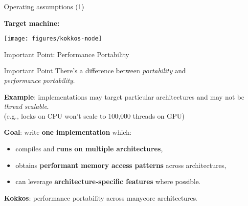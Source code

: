 
\begin{frame}{Operating assumptions (1)}

  \textbf{Target machine:}
  \begin{center}
    \texttt{[image: figures/kokkos-node]}
  \end{center}

\end{frame}


\begin{frame}[fragile]{Important Point: Performance Portability}

  \begin{block}{Important Point}
    There's a difference between \emph{portability} and
    \\ \emph{performance portability}.
  \end{block}

  \textbf{Example}: implementations may target particular architectures and may not be \emph{thread scalable}. \\
    \hspace{20pt} (e.g., locks on CPU won't scale to 100,000 threads on GPU)

  \pause
  \vspace{5pt}

  \textbf{Goal}: write \textbf{one implementation} which:
  \begin{itemize}
    \item{compiles and \textbf{runs on multiple architectures},}
    \item{obtains \textbf{performant memory access patterns} across architectures,}
    \item{can leverage \textbf{architecture-specific features} where possible.}
  \end{itemize}

  \pause
  \vspace{5pt}
  \textbf{Kokkos}: performance portability across manycore architectures.

  \vspace{5pt}

\end{frame}
